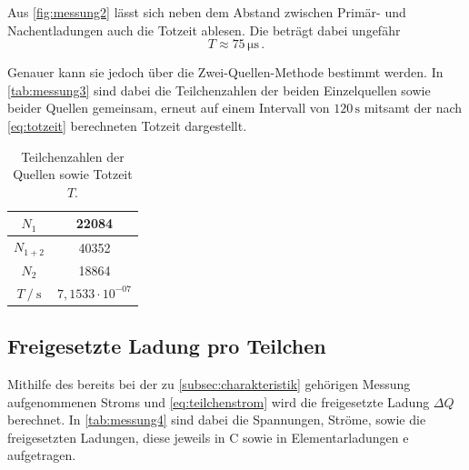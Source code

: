 Aus \autoref{fig:messung2} lässt sich neben dem Abstand zwischen Primär- und Nachentladungen auch die Totzeit ablesen.
Die beträgt dabei ungefähr
\begin{equation*}
    T \approx 75 \,\unit{\micro\second} \,.
\end{equation*}

Genauer kann sie jedoch über die Zwei-Quellen-Methode bestimmt werden.
In \autoref{tab:messung3} sind dabei die Teilchenzahlen der beiden Einzelquellen sowie beider Quellen gemeinsam, erneut auf einem Intervall von $120 \,\unit{\second}$ mitsamt der nach \eqref{eq:totzeit} berechneten Totzeit dargestellt.

\begin{table}[H]
    \centering
    \caption{Teilchenzahlen der Quellen sowie Totzeit $T$.}
    \label{tab:messung3}
    \begin{tabular}{|S | S|}
      \hline
        {$N_1$}                             &  22084    \\
        \hline
        {$N_{1 + 2}$ }                      &  40352    \\
        \hline
        {$N_2$}                             &  18864    \\
        \hline
        {$T \mathbin{/} \unit{\second}$}    &  {$7,1533 \cdot 10^{-07}$} \\
    \hline
    \end{tabular}
\end{table}


\subsection{Freigesetzte Ladung pro Teilchen}
\label{subsec:ladung}

Mithilfe des bereits bei der zu \autoref{subsec:charakteristik} gehörigen Messung aufgenommenen Stroms und \eqref{eq:teilchenstrom} wird die freigesetzte Ladung $\Delta Q$ berechnet.
In \autoref{tab:messung4} sind dabei die Spannungen, Ströme, sowie die freigesetzten Ladungen, diese jeweils in $\unit{\coulomb}$ sowie in Elementarladungen $\text{e}$ aufgetragen.

